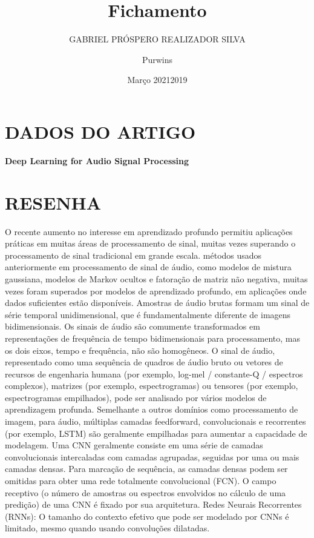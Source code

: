 \documentclass{article}
\title{Fichamento}
\author{GABRIEL PRÓSPERO REALIZADOR  SILVA}
\date{Março 2021}
\begin{document}
\maketitle

\section{DADOS DO ARTIGO}
\textbf{Deep Learning for Audio Signal Processing \\}
\author{Purwins\\}
\date{2019}

\section{RESENHA}
O recente aumento no interesse em aprendizado profundo permitiu aplicações práticas em muitas áreas de processamento de sinal, muitas vezes superando o processamento de sinal tradicional em grande escala.
métodos usados ​​anteriormente em processamento de sinal de áudio, como modelos de mistura gaussiana, modelos de Markov ocultos e fatoração de matriz não negativa, muitas vezes foram superados por modelos de aprendizado profundo, em aplicações onde dados suficientes estão disponíveis.
Amostras de áudio brutas formam um sinal de série temporal unidimensional, que é fundamentalmente diferente de imagens bidimensionais. Os sinais de áudio são comumente transformados em representações de frequência de tempo bidimensionais para processamento, mas os dois eixos, tempo e frequência, não são homogêneos.
O sinal de áudio, representado como uma sequência de quadros de áudio bruto ou vetores de recursos de engenharia humana (por exemplo, log-mel / constante-Q / espectros complexos), matrizes (por exemplo, espectrogramas) ou tensores (por exemplo, espectrogramas empilhados), pode ser analisado por vários modelos de aprendizagem profunda. Semelhante a outros domínios como processamento de imagem, para áudio, múltiplas camadas feedforward, convolucionais e recorrentes (por exemplo, LSTM) são geralmente empilhadas para aumentar a capacidade de modelagem.
Uma CNN geralmente consiste em uma série de camadas convolucionais intercaladas com camadas agrupadas, seguidas por uma ou mais camadas densas. Para marcação de sequência, as camadas densas podem ser omitidas para obter uma rede totalmente convolucional (FCN). O campo receptivo (o número de amostras ou espectros envolvidos no cálculo de uma predição) de uma CNN é fixado por sua arquitetura.
Redes Neurais Recorrentes (RNNs): O tamanho do contexto efetivo que pode ser modelado por CNNs é limitado, mesmo quando usando convoluções dilatadas.
\end{document}
